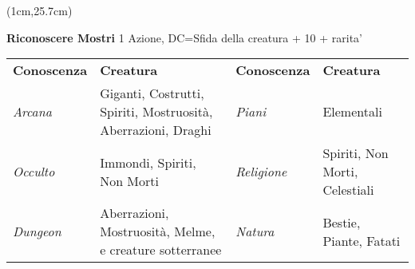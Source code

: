 \documentclass[a4paper,12 pt,openany]{book}
\begin{document}
\begin{textblock*}{19 cm}(1cm,25.7cm)

\textbf{Riconoscere Mostri} 1 Azione, 	DC=Sfida della creatura + 10 + rarita'

\begin{tabularx}{0.95\textwidth}{lX|lX}
\textbf{Conoscenza} & \textbf{Creatura}&\textbf{Conoscenza} & \textbf{Creatura}\\
\textit{Arcana}& Giganti, Costrutti, Spiriti, Mostruosità, Aberrazioni, Draghi&
\textit{Piani}& Elementali\\
\textit{Occulto}& Immondi, Spiriti, Non Morti&
\textit{Religione}& Spiriti, Non Morti, Celestiali\\
\textit{Dungeon}& Aberrazioni, Mostruosità, Melme, e creature sotterranee&
\textit{Natura}& Bestie, Piante, Fatati\\
\end{tabularx}

\end{textblock*}

~\newpage
\end{document}
